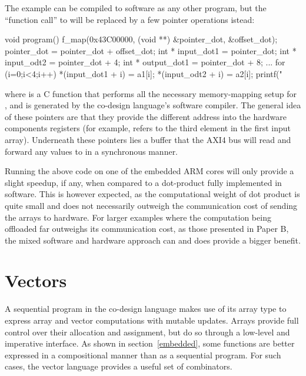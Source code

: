 \documentclass[../paper.tex]{subfiles}
\begin{document}
The example  can be compiled to software as any other program, but the ``function call'' to  will be replaced by a few pointer operations istead:

\begin{code}
void program() {
  f_map(0x43C00000, (void **) &pointer_dot, &offset_dot);
  pointer_dot = pointer_dot + offset_dot;
  int * input_dot1  = pointer_dot;
  int * input_odt2  = pointer_dot + 4;
  int * output_dot1 = pointer_dot + 8;
  ...
  for (i=0;i<4;i++) {
    *(input_dot1 + i) = a1[i];
    *(input_odt2 + i) = a2[i];
  }
  printf("%
}
\end{code}

\noindent where  is a C function that performs all the necessary memory-mapping setup for , and is generated by the co-design language's software compiler. The general idea of these pointers are that they provide the different address into the hardware components registers (for example,  refers to the third element in the first input array). Underneath these pointers lies a buffer that the AXI4 bus will read and forward any values to  in a synchronous manner.

Running the above code on one of the embedded ARM cores will only provide a slight speedup, if any,  when compared to a dot-product fully implemented in software. This is however expected, as the computational weight of dot product is quite small and does not necessarily outweigh the communication cost of sending the arrays to hardware. For larger examples where the computation being offloaded far outweighs its communication cost, as those presented in Paper B, the mixed software and hardware approach can and does provide a bigger benefit.

\section{Vectors}
\label{vectors}

A sequential program in the co-design language makes use of its array type to express array and vector computations with mutable updates. Arrays provide full control over their allocation and assignment, but do so through a low-level and imperative interface. As shown in section~\ref{embedded}, some functions are better expressed in a compositional manner than as a sequential program. For such cases, the vector language provides a useful set of combinators.
\end{document}
